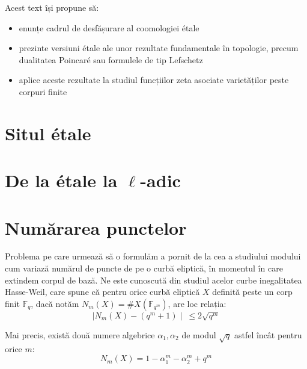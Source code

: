 \documentclass[13pt,openany]{book}
\begin{document}
Acest text își propune să:

\begin{itemize}
\item enunțe cadrul de desfășurare al coomologiei étale
\item prezinte versiuni étale ale unor rezultate fundamentale în topologie, precum dualitatea Poincaré sau formulele de tip Lefschetz
\item aplice aceste rezultate la studiul funcțiilor zeta asociate varietăților peste corpuri finite
\end{itemize}

\newpage
\phantom{X}
\newpage

\pagestyle{headings}
\setcounter{secnumdepth}{2}

\chapter{Situl étale}
\setcounter{page}{1}

\chapter{De la étale la \texorpdfstring{$\ell$}{l}-adic}

\chapter{Numărarea punctelor}

Problema pe care urmează să o formulăm a pornit de la cea a studiului modului cum variază numărul de puncte de pe o curbă eliptică, în momentul în care extindem corpul de bază. Ne este cunoscută din studiul acelor curbe inegalitatea Hasse-Weil, care spune că pentru orice curbă eliptică $X$ definită peste un corp finit $\mathbb{F}_q$, dacă notăm $N_m(X)=\#X(\mathbb{F}_{q^m})$, are loc relația:
$$\mid N_m(X) - (q^m+1)\mid\  \leq 2\sqrt{q^m}$$

Mai precis, există două numere algebrice $\alpha_1,\alpha_2$ de modul $\sqrt{q}$ astfel încât pentru orice $m$:
$$N_m(X) = 1 - \alpha_1^m - \alpha_2^m + q^m$$
\end{document}
